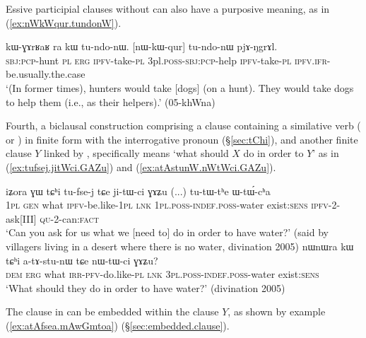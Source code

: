 Essive participial clauses without  can also have a purposive meaning, as in (\ref{ex:nWkWqur.tundonW}).

\begin{exe}
\ex \label{ex:nWkWqur.tundonW}
\gll  kɯ-ɣɤrʁaʁ ra kɯ tu-ndo-nɯ. [nɯ-kɯ-qur] tu-ndo-nɯ pjɤ-ŋgrɤl. \\
\textsc{sbj}:\textsc{pcp}-hunt \textsc{pl} \textsc{erg} \textsc{ipfv}-take-\textsc{pl} 3pl.\textsc{poss}-\textsc{sbj}:\textsc{pcp}-help \textsc{ipfv}-take-\textsc{pl} \textsc{ipfv}.\textsc{ifr}-be.usually.the.case \\
\glt `(In former times), hunters would take [dogs] (on a hunt). They would take dogs to help them (i.e., as their helpers).' (05-khWna)
\end{exe}

Fourth, a biclausal construction comprising a clause containing a similative verb ( or ) in finite form with the interrogative pronoun (§\ref{sec:tChi}), and another finite clause $Y$ linked by , specifically means `what should $X$ do in order to $Y$' as in (\ref{ex:tufsej.jitWci.GAZu}) and (\ref{ex:atAstunW.nWtWci.GAZu}).

 \begin{exe}
 \ex  
 \begin{xlist}
\ex \label{ex:tufsej.jitWci.GAZu}
\gll  iʑora ɣɯ tɕʰi tu-fse-j tɕe ji-tɯ-ci ɣɤʑu (...) tu-tɯ-tʰe ɯ-tɯ́-cʰa \\
\textsc{1pl} \textsc{gen} what \textsc{ipfv}-be.like-\textsc{1pl} \textsc{lnk} \textsc{1pl}.\textsc{poss}-\textsc{indef}.\textsc{poss}-water exist:\textsc{sens} { } \textsc{ipfv}-2-ask[III] \textsc{qu}-2-can:\textsc{fact} \\
\glt `Can you ask for us what we [need to] do in order to have water?' (said by villagers living in a desert where there is no water, divination 2005)
\ex \label{ex:atAstunW.nWtWci.GAZu}
\gll nɯnɯra kɯ tɕʰi a-tɤ-stu-nɯ tɕe nɯ-tɯ-ci ɣɤʑu? \\
\textsc{dem} \textsc{erg} what \textsc{irr}-\textsc{pfv}-do.like-\textsc{pl} \textsc{lnk} \textsc{3pl}.\textsc{poss}-\textsc{indef}.\textsc{poss}-water exist:\textsc{sens} \\
\glt `What should they do in order to have water?' (divination 2005)
 \end{xlist}
\end{exe} 

 The clause in  can be embedded within the clause $Y$, as shown by example (\ref{ex:atAfsea.mAwGmtoa}) (§\ref{sec:embedded.clause}).


